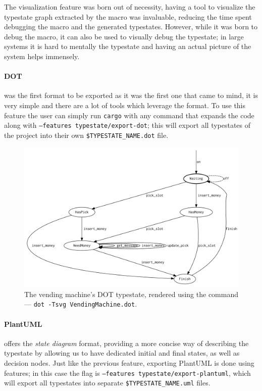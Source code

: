 The visualization feature was born out of necessity,
having a tool to visualize the typestate graph extracted by the macro was invaluable,
reducing the time spent debugging the macro and the generated typestates.
However, while it was born to debug the macro, it can also be used to visually debug the typestate;
in large systems it is hard to mentally  the typestate and having an actual picture of the system helps immensely.

\paragraph{DOT} was the first format to be exported as it was the first one that came to mind,
it is very simple and there are a lot of tools which leverage the format.
To use this feature the user can simply run \texttt{cargo} with any command that expands the code along with \texttt{--features typestate/export-dot};
this will export all typestates of the project into their own \texttt{\$TYPESTATE\_NAME.dot} file.

\begin{figure}
    \centering
    \includegraphics[width=\linewidth]{Chapters/Figures/C4/VendingMachine.dot.pdf}
    \caption{The vending machine's DOT typestate, rendered using the command --- \texttt{dot -Tsvg VendingMachine.dot}.}
    \label{fig:vending-machine-typestate-dot}
\end{figure}

\paragraph{PlantUML} offers the \emph{state diagram} format, providing a more concise way of describing the typestate
by allowing us to have dedicated initial and final states, as well as decision nodes.
Just like the previous feature, exporting PlantUML is done using features;
in this case the flag is \texttt{--features typestate/export-plantuml},
which will export all typestates into separate \texttt{\$TYPESTATE\_NAME.uml} files.


